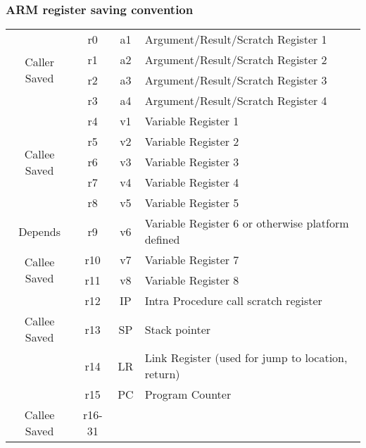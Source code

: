 \documentclass{report}
\begin{document}
\subsubsection*{ARM register saving convention}
\begin{center}
	\begin{tabular}{c c c l}
		\multirow{4}{*}{Caller Saved} & r0     & a1 & Argument/Result/Scratch Register 1                \\
		                              & r1     & a2 & Argument/Result/Scratch Register 2                \\
		                              & r2     & a3 & Argument/Result/Scratch Register 3                \\
		                              & r3     & a4 & Argument/Result/Scratch Register 4                \\
		\hline
		\multirow{5}{*}{Callee Saved} & r4     & v1 & Variable Register 1                               \\
		                              & r5     & v2 & Variable Register 2                               \\
		                              & r6     & v3 & Variable Register 3                               \\
		                              & r7     & v4 & Variable Register 4                               \\
		                              & r8     & v5 & Variable Register 5                               \\
		\hline
		Depends                       & r9     & v6 & Variable Register 6 or otherwise platform defined \\
		\hline
		\multirow{2}{*}{Callee Saved} & r10    & v7 & Variable Register 7                               \\
		                              & r11    & v8 & Variable Register 8                               \\
		\hline
		                              & r12    & IP & Intra Procedure call scratch register             \\
		\hline
		Callee Saved                  & r13    & SP & Stack pointer                                     \\
		\hline
		                              & r14    & LR & Link Register (used for jump to location, return) \\
		                              & r15    & PC & Program Counter                                   \\
		\hline
		Callee Saved                  & r16-31                                                          \\
	\end{tabular}
\end{center}
\end{document}
